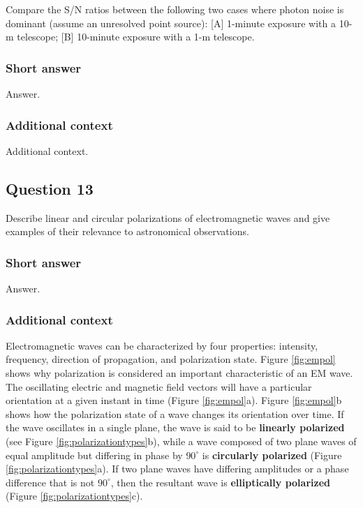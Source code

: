 \documentclass[a4paper,10pt]{article}
\begin{document}
Compare the S/N ratios between the following two cases where photon noise is dominant (assume an unresolved point source): [A] 1-minute exposure with a 10-m telescope; [B] 10-minute exposure with a 1-m telescope.

\subsubsection{Short answer}

Answer.

\subsubsection{Additional context}

Additional context.


\newpage
\subsection{Question 13}

Describe linear and circular polarizations of electromagnetic waves and give examples of their relevance to astronomical observations.

\subsubsection{Short answer}

Answer.

\subsubsection{Additional context}

{\noindent}Electromagnetic waves can be characterized by four properties: intensity, frequency, direction of propagation, and polarization state. Figure \ref{fig:empol} shows why polarization is considered an important characteristic of an EM wave. The oscillating electric and magnetic field vectors will have a particular orientation at a given instant in time (Figure \ref{fig:empol}a). Figure \ref{fig:empol}b shows how the polarization state of a wave changes its orientation over time. If the wave oscillates in a single plane, the wave is said to be \textbf{linearly polarized} (see Figure \ref{fig:polarizationtypes}b), while a wave composed of two plane waves of equal amplitude but differing in phase by $90^\circ$ is \textbf{circularly polarized} (Figure \ref{fig:polarizationtypes}a). If two plane waves have differing amplitudes or a phase difference that is not $90^\circ$, then the resultant wave is \textbf{elliptically polarized} (Figure \ref{fig:polarizationtypes}c).
\end{document}
